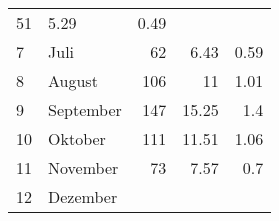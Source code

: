 \begin{longtable}{lXrrr}
       \num{51} &
       \num[round-mode=places,round-precision=2]{5.29} &
         \num[round-mode=places,round-precision=2]{0.49} \\

     7 &
     \multicolumn{1}{X}{ Juli   } &


       \num{62} &
       \num[round-mode=places,round-precision=2]{6.43} &
         \num[round-mode=places,round-precision=2]{0.59} \\

     8 &
     \multicolumn{1}{X}{ August   } &


       \num{106} &
       \num[round-mode=places,round-precision=2]{11} &
         \num[round-mode=places,round-precision=2]{1.01} \\

     9 &
     \multicolumn{1}{X}{ September   } &


       \num{147} &
       \num[round-mode=places,round-precision=2]{15.25} &
         \num[round-mode=places,round-precision=2]{1.4} \\

     10 &
     \multicolumn{1}{X}{ Oktober   } &


       \num{111} &
       \num[round-mode=places,round-precision=2]{11.51} &
         \num[round-mode=places,round-precision=2]{1.06} \\

     11 &
     \multicolumn{1}{X}{ November   } &


       \num{73} &
       \num[round-mode=places,round-precision=2]{7.57} &
         \num[round-mode=places,round-precision=2]{0.7} \\

     12 &
     \multicolumn{1}{X}{ Dezember   } &



\end{longtable}
